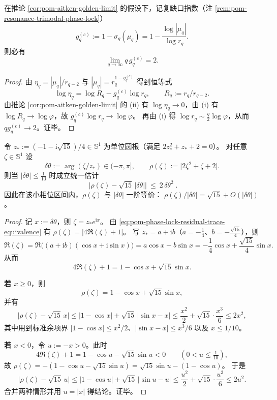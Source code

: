 \begin{corollary}[共振饱和 \texorpdfstring{$\Rightarrow$}{=>} 复缺口指数的 \texorpdfstring{$2/q$}{2/q} 标度律]\label{cor:pom-resonance-complex-gap-2overq}
在推论 \ref{cor:pom-aitken-golden-limit} 的假设下，记复缺口指数（注 \ref{rem:pom-resonance-trimodal-phase-lock}）
\[
g_q^{(c)}:=1-\sigma_q(\mu_q)=1-\frac{\log|\mu_q|}{\log r_q}.
\]
则必有
\[
\lim_{q\to\infty}q\,g_q^{(c)}=2.
\]
\end{corollary}
\begin{proof}
由 \(\eta_q=|\mu_q|/r_{q-2}\) 与 \(|\mu_q|=r_q^{1-g_q^{(c)}}\) 得到恒等式
\[
\log\eta_q=\log R_q-g_q^{(c)}\log r_q,
\qquad R_q:=r_q/r_{q-2}.
\]
由推论 \ref{cor:pom-aitken-golden-limit} 的 (ii) 有 \(\log\eta_q\to 0\)，由 (i) 有 \(\log R_q\to\log\varphi\)，故
\(
g_q^{(c)}\log r_q\to\log\varphi
\)。
再由 (i) 得 \(\log r_q\sim \frac{q}{2}\log\varphi\)，从而 \(qg_q^{(c)}\to 2\)。证毕。
\end{proof}



\begin{proposition}\label{prop:pom-phase-residual-linearization-sqrt15}
令 \(z_\ast:=(-1-\mathrm{i}\sqrt{15})/4\in\mathbb{S}^1\) 为单位圆根（满足 \(2z_\ast^2+z_\ast+2=0\)）。
对任意 \(\zeta\in\mathbb{S}^1\) 设
\[
\delta\theta:=\arg(\zeta/z_\ast)\in(-\pi,\pi],
\qquad
\rho(\zeta):=\bigl|2\zeta^2+\zeta+2\bigr|.
\]
则当 \(|\delta\theta|\le \tfrac{1}{10}\) 时成立统一估计
\[
\boxed{\;
\bigl|\rho(\zeta)-\sqrt{15}\,|\delta\theta|\bigr|\ \le\ 2\,\delta\theta^{2}\; }.
\]
因此在该小相位区间内，\(\rho(\zeta)\) 与 \(|\delta\theta|\) 一阶等价：
\(
\rho(\zeta)/|\delta\theta|=\sqrt{15}+O(|\delta\theta|)
\)。
\end{proposition}
\begin{proof}
记 \(x:=\delta\theta\)，则 \(\zeta=z_\ast e^{\mathrm{i}x}\)。
由 \eqref{eq:pom-phase-lock-residual-trace-equivalence} 有 \(\rho(\zeta)=|4\Re(\zeta)+1|\)。
写 \(z_\ast=a+\mathrm{i}b\)（\(a=-\tfrac14\)、\(b=-\tfrac{\sqrt{15}}{4}\)），则
\[
\Re(\zeta)=\Re\bigl((a+\mathrm{i}b)(\cos x+\mathrm{i}\sin x)\bigr)=a\cos x-b\sin x
=-\frac14\cos x+\frac{\sqrt{15}}{4}\sin x.
\]
从而
\[
4\Re(\zeta)+1=1-\cos x+\sqrt{15}\sin x.
\]
\par
\textbf{若 \(x\ge 0\)}，则
\[
\rho(\zeta)=1-\cos x+\sqrt{15}\sin x,
\]
并有
\[
\bigl|\rho(\zeta)-\sqrt{15}\,x\bigr|
\le |1-\cos x|+\sqrt{15}\,|\sin x-x|
\le \frac{x^2}{2}+\sqrt{15}\cdot\frac{x^3}{6}
\le 2x^2,
\]
其中用到标准余项界 \(|1-\cos x|\le x^2/2\)、\(|\sin x-x|\le x^3/6\) 以及 \(x\le 1/10\)。
\par
\textbf{若 \(x<0\)}，令 \(u:=-x>0\)。此时
\[
4\Re(\zeta)+1=1-\cos u-\sqrt{15}\sin u<0\qquad(0<u\le\tfrac{1}{10}),
\]
故 \(\rho(\zeta)=-(1-\cos u-\sqrt{15}\sin u)=\sqrt{15}\sin u-(1-\cos u)\)。
于是
\[
\bigl|\rho(\zeta)-\sqrt{15}\,u\bigr|
\le |1-\cos u|+\sqrt{15}\,|\sin u-u|
\le \frac{u^2}{2}+\sqrt{15}\cdot\frac{u^3}{6}
\le 2u^2.
\]
合并两种情形并用 \(u=|x|\) 得结论。证毕。
\end{proof}

